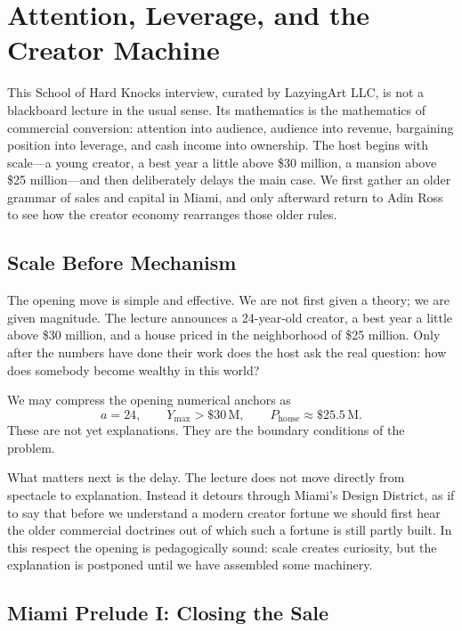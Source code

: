 \chapter{Attention, Leverage, and the Creator Machine}

This School of Hard Knocks interview, curated by LazyingArt LLC, is not a blackboard lecture in the usual sense. Its mathematics is the mathematics of commercial conversion: attention into audience, audience into revenue, bargaining position into leverage, and cash income into ownership. The host begins with scale---a young creator, a best year a little above \$30 million, a mansion above \$25 million---and then deliberately delays the main case. We first gather an older grammar of sales and capital in Miami, and only afterward return to Adin Ross to see how the creator economy rearranges those older rules.

\section{Scale Before Mechanism}

The opening move is simple and effective. We are not first given a theory; we are given magnitude. The lecture announces a 24-year-old creator, a best year a little above \$30 million, and a house priced in the neighborhood of \$25 million. Only after the numbers have done their work does the host ask the real question: how does somebody become wealthy in this world?

We may compress the opening numerical anchors as
\begin{equation}
a = 24,\qquad Y_{\max} > \$30\,\mathrm{M},\qquad P_{\text{house}} \approx \$25.5\,\mathrm{M}.
\end{equation}
These are not yet explanations. They are the boundary conditions of the problem.

What matters next is the delay. The lecture does not move directly from spectacle to explanation. Instead it detours through Miami's Design District, as if to say that before we understand a modern creator fortune we should first hear the older commercial doctrines out of which such a fortune is still partly built. In this respect the opening is pedagogically sound: scale creates curiosity, but the explanation is postponed until we have assembled some machinery.

\section{Miami Prelude I: Closing the Sale}

